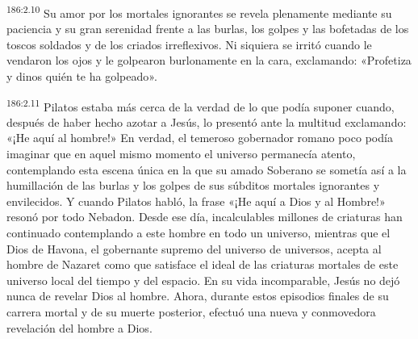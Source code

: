 \par 
\textsuperscript{186:2.10} Su amor por los mortales ignorantes se revela plenamente mediante su paciencia y su gran serenidad frente a las burlas, los golpes y las bofetadas de los toscos soldados y de los criados irreflexivos. Ni siquiera se irritó cuando le vendaron los ojos y le golpearon burlonamente en la cara, exclamando: «Profetiza y dinos quién te ha golpeado».

\par 
\textsuperscript{186:2.11} Pilatos estaba más cerca de la verdad de lo que podía suponer cuando, después de haber hecho azotar a Jesús, lo presentó ante la multitud exclamando: «¡He aquí al hombre!» En verdad, el temeroso gobernador romano poco podía imaginar que en aquel mismo momento el universo permanecía atento, contemplando esta escena única en la que su amado Soberano se sometía así a la humillación de las burlas y los golpes de sus súbditos mortales ignorantes y envilecidos. Y cuando Pilatos habló, la frase «¡He aquí a Dios y al Hombre!» resonó por todo Nebadon. Desde ese día, incalculables millones de criaturas han continuado contemplando a este hombre en todo un universo, mientras que el Dios de Havona, el gobernante supremo del universo de universos, acepta al hombre de Nazaret como que satisface el ideal de las criaturas mortales de este universo local del tiempo y del espacio. En su vida incomparable, Jesús no dejó nunca de revelar Dios al hombre. Ahora, durante estos episodios finales de su carrera mortal y de su muerte posterior, efectuó una nueva y conmovedora revelación del hombre a Dios.

